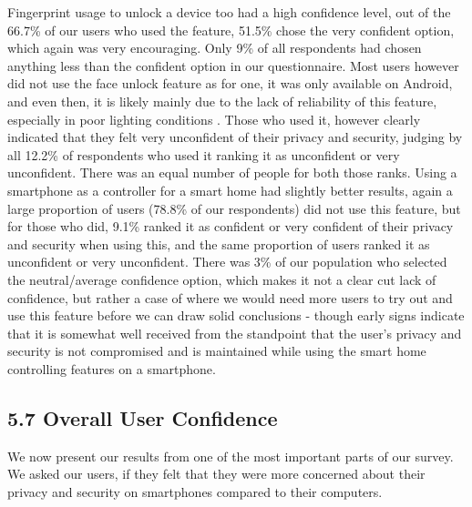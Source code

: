 \documentclass{sigchi}
\begin{document}
Fingerprint usage to unlock a device too had a high confidence level, out of the 66.7\% of our users who used the feature, 51.5\% chose the very confident option, which again was very encouraging. Only 9\% of all respondents had chosen anything less than the confident option in our questionnaire. Most users however did not use the face unlock feature as for one, it was only available on Android, and even then, it is likely mainly due to the lack of reliability of this feature, especially in poor lighting conditions \cite{lemonnier_2015}. Those who used it, however clearly indicated that they felt very unconfident of their privacy and security, judging by all 12.2\% of respondents who used it ranking it as unconfident or very unconfident. There was an equal number of people for both those ranks. Using a smartphone as a controller for a smart home had slightly better results, again a large proportion of users (78.8\% of our respondents) did not use this feature, but for those who did, 9.1\% ranked it as confident or very confident of their privacy and security when using this, and the same proportion of users ranked it as unconfident or very unconfident. There was 3\% of our population who selected the neutral/average confidence option, which makes it not a clear cut lack of confidence, but rather a case of where we would need more users to try out and use this feature before we can draw solid conclusions - though early signs indicate that it is somewhat well received from the standpoint that the user's privacy and security is not compromised and is maintained while using the smart home controlling features on a smartphone.

\subsection{5.7 Overall User Confidence}

We now present our results from one of the most important parts of our survey. We asked our users, if they felt that they were more concerned about their privacy and security on smartphones compared to their computers. 
\end{document}
